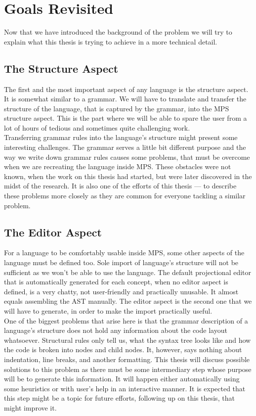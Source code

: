 \chapter{Goals Revisited}

Now that we have introduced the background of the problem we will try to explain what this thesis is trying to achieve in a more technical detail.

\section{The Structure Aspect}
The first and the most important aspect of any language is the structure aspect.
It is somewhat similar to a grammar.
We will have to translate and transfer the structure of the language, that is captured by the grammar, into the MPS structure aspect.
This is the part where we will be able to spare the user from a lot of hours of tedious and sometimes quite challenging work.
\\

Transferring grammar rules into the language's structure might present some interesting challenges.
The grammar serves a little bit different purpose and the way we write down grammar rules causes some problems, that must be overcome when we are recreating the language inside MPS.
These obstacles were not known, when the work on this thesis had started, but were later discovered in the midst of the research.
It is also one of the efforts of this thesis --- to describe these problems more closely as they are common for everyone tackling a similar problem.

\section{The Editor Aspect}
For a language to be comfortably usable inside MPS, some other aspects of the language must be defined too.
Sole import of language's structure will not be sufficient as we won't be able to use the language.
The default projectional editor that is automatically generated for each concept, when no editor aspect is defined, is a very chatty, not user-friendly and practically unusable.
It almost equals assembling the AST manually.
The editor aspect is the second one that we will have to generate, in order to make the import practically useful.
\\

One of the biggest problems that arise here is that the grammar description of a language's structure does not hold any information about the code layout whatsoever.
Structural rules only tell us, what the syntax tree looks like and how the code is broken into nodes and child nodes.
It, however, says nothing about indentation, line breaks, and another formatting.
This thesis will discuss possible solutions to this problem as there must be some intermediary step whose purpose will be to generate this information.
It will happen either automatically using some heuristics or with user's help in an interactive manner.
It is expected that this step might be a topic for future efforts, following up on this thesis, that might improve it.

